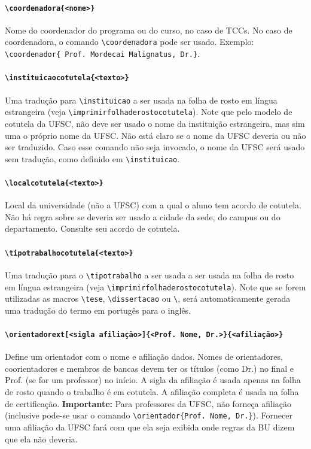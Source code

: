 \documentclass[embeddedlogo]{ufsc-thesis-rn46-2019}
\newcommand{\lacmd}[1]{\texttt{\textbackslash{}#1}}
\begin{document}
\paragraph*{\lacmd{coordenadora\{<nome>\}}} Nome do coordenador do programa ou
do curso, no caso de TCCs. No caso de coordenadora, o comando
\lacmd{coordenadora} pode ser usado. Exemplo: \lacmd{coordenador\{
  Prof. Mordecai Malignatus, Dr.\}}.

\paragraph*{\lacmd{instituicaocotutela\{<texto>\}}} Uma tradução para
\lacmd{instituicao} a ser usada na folha de rosto em língua estrangeira (veja
\lacmd{imprimirfolhaderostocotutela}). Note que pelo modelo de cotutela da UFSC,
não deve ser usado o nome da instituição estrangeira, mas sim uma o próprio nome
da UFSC. Não está claro se o nome da UFSC deveria ou não ser traduzido. Caso
esse comando não seja invocado, o nome da UFSC será usado sem tradução, como
definido em \lacmd{instituicao}.

\paragraph*{\lacmd{localcotutela\{<texto>\}}} Local da universidade (não a UFSC)
com a qual o aluno tem acordo de cotutela. Não há regra sobre se deveria ser
usado a cidade da sede, do campus ou do departamento. Consulte seu acordo de
cotutela.

\paragraph*{\lacmd{tipotrabalhocotutela\{<texto>\}}} Uma tradução para o
\lacmd{tipotrabalho} a ser usada a ser usada na folha de rosto em língua
estrangeira (veja \lacmd{imprimirfolhaderostocotutela}). Note que se forem
utilizadas as macros \lacmd{tese}, \lacmd{dissertacao} ou \lacmd{\tcc}, será
automaticamente gerada uma tradução do termo em portugês para o inglês.

\paragraph*{\lacmd{orientadorext[<sigla afiliação>]\{<Prof. Nome, Dr.>\}\{<afiliação>\}}}
Define um orientador com o nome e afiliação dados. Nomes de orientadores,
coorientadores e membros de bancas devem ter os títulos (como Dr.) no final e
Prof. (se for um professor) no início. A sigla da afiliação é usada apenas na
folha de rosto quando o trabalho é em cotutela. A afiliação completa é usada na
folha de certificação. \textbf{Importante:} Para professores da UFSC, não
forneça afiliação (inclusive pode-se usar o comando \lacmd{orientador\{Prof.
Nome, Dr.\}}). Fornecer uma afiliação da UFSC fará com que ela seja exibida
onde regras da BU dizem que ela não deveria.
\end{document}
